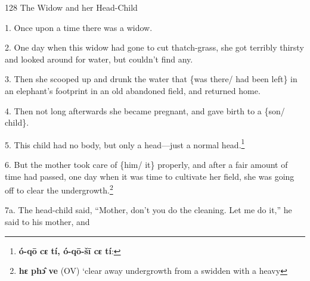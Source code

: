 
128 The Widow and her Head-Child

1. Once upon a time there was a widow.

2. One day when this widow had gone to cut thatch-grass, she got terribly thirsty
and looked around for water, but couldn't find any.

3. Then she scooped up and drunk the water that \{was there/ had been left\} in
an elephant's footprint in an old abandoned field, and returned home.

4. Then not long afterwards she became pregnant, and gave birth to a \{son/ child\}.

5. This child had no body, but only a head---just a normal head.\footnote{\textbf{ó-qō cɛ tí, ó-qō-šī cɛ tí}:}

6. But the mother took care of \{him/ it\} properly, and after a fair amount of
time had passed, one day when it was time to cultivate her field, she was going
off to clear the undergrowth.\footnote{\textbf{hɛ phɔ̂ ve }(OV) `clear away undergrowth from a swidden with a heavy}

7a. The head-child said, ``Mother, don't you do the cleaning. Let me do it,'' he
said to his mother, and


